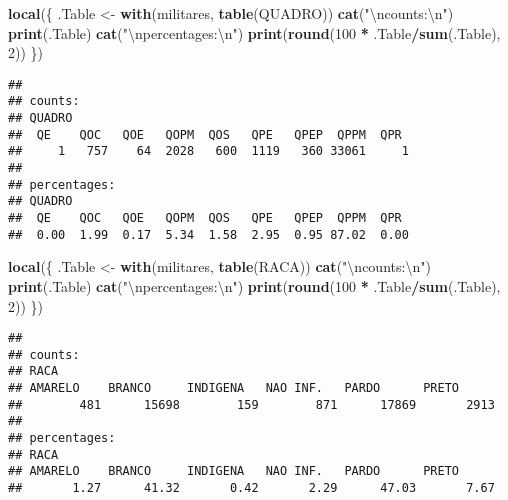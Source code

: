 \documentclass[
]{article}
\newenvironment{Shaded}{\begin{snugshade}}{\end{snugshade}}
\newcommand{\CharTok}[1]{\textcolor[rgb]{0.31,0.60,0.02}{#1}}
\newcommand{\DecValTok}[1]{\textcolor[rgb]{0.00,0.00,0.81}{#1}}
\newcommand{\KeywordTok}[1]{\textcolor[rgb]{0.13,0.29,0.53}{\textbf{#1}}}
\newcommand{\NormalTok}[1]{#1}
\newcommand{\OperatorTok}[1]{\textcolor[rgb]{0.81,0.36,0.00}{\textbf{#1}}}
\newcommand{\StringTok}[1]{\textcolor[rgb]{0.31,0.60,0.02}{#1}}
\begin{document}
\begin{Shaded}
\begin{Highlighting}[]
\KeywordTok{local}\NormalTok{(\{}
\NormalTok{    .Table <-}\StringTok{ }\KeywordTok{with}\NormalTok{(militares, }\KeywordTok{table}\NormalTok{(QUADRO))}
    \KeywordTok{cat}\NormalTok{(}\StringTok{"}\CharTok{\textbackslash{}n}\StringTok{counts:}\CharTok{\textbackslash{}n}\StringTok{"}\NormalTok{)}
    \KeywordTok{print}\NormalTok{(.Table)}
    \KeywordTok{cat}\NormalTok{(}\StringTok{"}\CharTok{\textbackslash{}n}\StringTok{percentages:}\CharTok{\textbackslash{}n}\StringTok{"}\NormalTok{)}
    \KeywordTok{print}\NormalTok{(}\KeywordTok{round}\NormalTok{(}\DecValTok{100} \OperatorTok{*}\StringTok{ }\NormalTok{.Table}\OperatorTok{/}\KeywordTok{sum}\NormalTok{(.Table), }\DecValTok{2}\NormalTok{))}
\NormalTok{\})}
\end{Highlighting}
\end{Shaded}

\begin{verbatim}
## 
## counts:
## QUADRO
##  QE    QOC   QOE   QOPM  QOS   QPE   QPEP  QPPM  QPR  
##     1   757    64  2028   600  1119   360 33061     1 
## 
## percentages:
## QUADRO
##  QE    QOC   QOE   QOPM  QOS   QPE   QPEP  QPPM  QPR  
##  0.00  1.99  0.17  5.34  1.58  2.95  0.95 87.02  0.00
\end{verbatim}

\begin{Shaded}
\begin{Highlighting}[]
\KeywordTok{local}\NormalTok{(\{}
\NormalTok{    .Table <-}\StringTok{ }\KeywordTok{with}\NormalTok{(militares, }\KeywordTok{table}\NormalTok{(RACA))}
    \KeywordTok{cat}\NormalTok{(}\StringTok{"}\CharTok{\textbackslash{}n}\StringTok{counts:}\CharTok{\textbackslash{}n}\StringTok{"}\NormalTok{)}
    \KeywordTok{print}\NormalTok{(.Table)}
    \KeywordTok{cat}\NormalTok{(}\StringTok{"}\CharTok{\textbackslash{}n}\StringTok{percentages:}\CharTok{\textbackslash{}n}\StringTok{"}\NormalTok{)}
    \KeywordTok{print}\NormalTok{(}\KeywordTok{round}\NormalTok{(}\DecValTok{100} \OperatorTok{*}\StringTok{ }\NormalTok{.Table}\OperatorTok{/}\KeywordTok{sum}\NormalTok{(.Table), }\DecValTok{2}\NormalTok{))}
\NormalTok{\})}
\end{Highlighting}
\end{Shaded}

\begin{verbatim}
## 
## counts:
## RACA
## AMARELO    BRANCO     INDIGENA   NAO INF.   PARDO      PRETO      
##        481      15698        159        871      17869       2913 
## 
## percentages:
## RACA
## AMARELO    BRANCO     INDIGENA   NAO INF.   PARDO      PRETO      
##       1.27      41.32       0.42       2.29      47.03       7.67
\end{verbatim}
\end{document}
